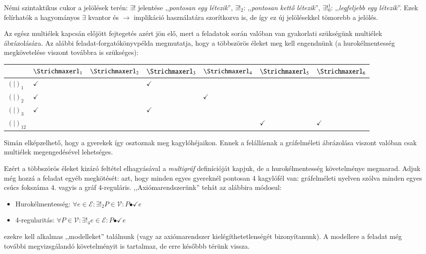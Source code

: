 \documentclass{article}
\newcommand{\she}[1]{\ensuremath{\Strichmaxerl_{#1}}}
\newcommand{\oys}[1]{\ensuremath{(\!|\!)_{#1}}}
\newcommand{\chm}{$\checkmark$}
\newcommand{\incidsymbol}{\bullet\!\!\!\checkmark}
\newcommand{\incid}{\mathrel{\incidsymbol}} %
\begin{document}
	Némi szintaktikus cukor a jelölések terén: $\exists!$ jelentése ,,\emph{pontosan egy létezik}'', $\exists!_2$: ,,\emph{pontosan kettő létezik}'', $\exists!_0^1$: ,,\emph{legfeljebb egy létezik}''. Ezek felírhatók a hagyományos $\exists$ kvantor és $\to$ implikáció használatára szorítkozva is, de így ez új jelölésekkel tömorebb a jelölés.

	Az egész multiélek kapcsán előjött fejtegetés azért jön elő, mert a feladatok során valóban van gyakorlati szükségünk multiélek ábrázolására.
	Az alábbi feladat-forgatókönyvpélda megmutatja, hogy a többszörös éleket meg kell engendnünk (a hurokélmentesség megkövetelése viszont továbbra is szükséges):

	\begin{tabular}{l||l|l|l|l|l|l|}
		         & $\she1$ & $\she2$ & $\she3$ & $\she4$ & $\she5$ & $\she6$\\\hline\hline
		$\oys1$    & \chm  &       & \chm  &       &       &      \\\hline
		$\oys2$    & \chm  &       &       & \chm  &       &      \\\hline
		$\oys3$    & \chm  &       & \chm  &       &       &      \\\hline\hline\hline\hline
		$\oys{12}$ &       &       &       &       & \chm  & \chm \\\hline
	\end{tabular}

	Simán elképzelhető, hogy a gyerekek így osztoznak meg kagylóhéjaikon. Ennek a felállásnak a gráfelméleti ábrázolása viszont valóban csak multiélek megengedésével lehetséges.

	Ezért a többszörös éleket kizáró feltétel elhagyásával a \emph{multigráf} definícióját kapjuk, de a hurokélmentesség követelménye megmarad.
	Adjuk még hozzá a feladat egyéb megkötését: azt, hogy minden egyes gyereknél pontosan 4 kagylófél van: gráfelméleti nyelven szólva minden egyes csúcs fokszáma 4. vagyis a gráf 4-reguláris. ,,Axiómarendszerünk'' tehát az alábbira módosul:
	\begin{itemize}
		\item
		Hurokélmentesség: $\forall e \in \mathcal E: \exists!_2 P \in \mathcal V: P \incid e$ 
		\item
		4-regularitás: $\forall P \in \mathcal V: \exists!_4 e \in \mathcal E: P  \incid e$ 
	\end{itemize}
	ezekre kell alkalmas ,,modelleket'' találnunk (vagy az axiómarendszer kielégíthetetlenségét bizonyítanunk). A modellere a feladat még további megvizsgálandó követelményit is tartalmaz, de erre későbbb térünk vissza.
\end{document}
